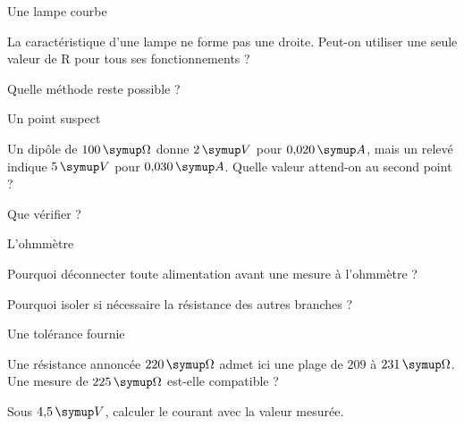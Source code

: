 \par\noindent\begin{minipage}{\linewidth}
\begin{exercice}[3]{Une lampe courbe}
\begin{questions}
\item La caractéristique d’une lampe ne forme pas une droite. Peut-on utiliser une seule valeur de R pour tous ses fonctionnements ?
\item Quelle méthode reste possible ?
\end{questions}
\end{exercice}
\end{minipage}
\par\noindent\begin{minipage}{\linewidth}
\begin{exercice}[3]{Un point suspect}
\begin{questions}
\item Un dipôle de $100\unite\Omega$ donne $2\unite V$ pour $0{,}020\unite A$, mais un relevé indique $5\unite V$ pour $0{,}030\unite A$. Quelle valeur attend-on au second point ?
\item Que vérifier ?
\end{questions}
\end{exercice}
\end{minipage}
\par\noindent\begin{minipage}{\linewidth}
\begin{exercice}[3]{L’ohmmètre}
\begin{questions}
\item Pourquoi déconnecter toute alimentation avant une mesure à l’ohmmètre ?
\item Pourquoi isoler si nécessaire la résistance des autres branches ?
\end{questions}
\end{exercice}
\end{minipage}
\par\noindent\begin{minipage}{\linewidth}
\begin{exercice}[3]{Une tolérance fournie}
\begin{questions}
\item Une résistance annoncée $220\unite\Omega$ admet ici une plage de $209$ à $231\unite\Omega$. Une mesure de $225\unite\Omega$ est-elle compatible ?
\item Sous $4{,}5\unite V$, calculer le courant avec la valeur mesurée.
\end{questions}
\end{exercice}
\end{minipage}
